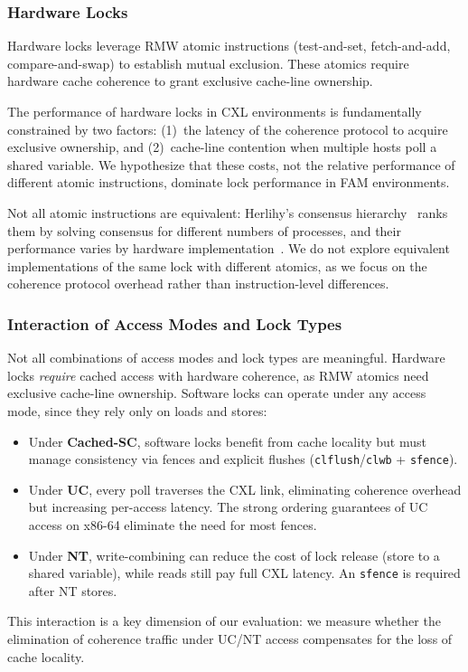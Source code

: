 \subsubsection{Hardware Locks}

Hardware locks leverage RMW atomic instructions (test-and-set, fetch-and-add, compare-and-swap) to establish mutual exclusion.
These atomics require hardware cache coherence to grant exclusive cache-line ownership.

The performance of hardware locks in CXL environments is fundamentally constrained by two factors: (1)~the latency of the coherence protocol to acquire exclusive ownership, and (2)~cache-line contention when multiple hosts poll a shared variable.
We hypothesize that these costs, not the relative performance of different atomic instructions, dominate lock performance in FAM environments.

Not all atomic instructions are equivalent: Herlihy's consensus hierarchy~\cite{herlihyWaitfreeSynchronization1991} ranks them by solving consensus for different numbers of processes, and their performance varies by hardware implementation~\cite{schweizerEvaluatingCostAtomic2020}.
We do not explore equivalent implementations of the same lock with different atomics, as we focus on the coherence protocol overhead rather than instruction-level differences.

\subsubsection{Interaction of Access Modes and Lock Types}

Not all combinations of access modes and lock types are meaningful.
Hardware locks \emph{require} cached access with hardware coherence, as RMW atomics need exclusive cache-line ownership.
Software locks can operate under any access mode, since they rely only on loads and stores:
\begin{itemize}
    \item Under \textbf{Cached-SC}, software locks benefit from cache locality but must manage consistency via fences and explicit flushes (\texttt{clflush}/\texttt{clwb} + \texttt{sfence}).
    \item Under \textbf{UC}, every poll traverses the CXL link, eliminating coherence overhead but increasing per-access latency. The strong ordering guarantees of UC access on x86-64 eliminate the need for most fences.
    \item Under \textbf{NT}, write-combining can reduce the cost of lock release (store to a shared variable), while reads still pay full CXL latency. An \texttt{sfence} is required after NT stores.
\end{itemize}
This interaction is a key dimension of our evaluation: we measure whether the elimination of coherence traffic under UC/NT access compensates for the loss of cache locality.

